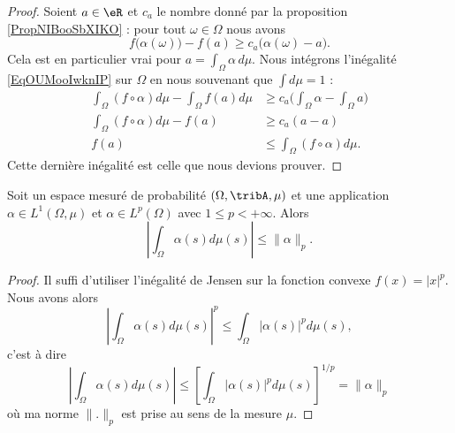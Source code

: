 \begin{proof}
    Soient \( a\in \eR\) et \( c_a\) le nombre donné par la proposition \ref{PropNIBooSbXIKO} : pour tout \( \omega\in \Omega\) nous avons
    \begin{equation}    \label{EqOUMooIwknIP}
        f\big( \alpha(\omega) \big)-f(a)\geq c_a\big( \alpha(\omega)-a \big).
    \end{equation}
    Cela est en particulier vrai pour \( a=\int_{\Omega}\alpha\,d\mu\). Nous intégrons l'inégalité \eqref{EqOUMooIwknIP} sur \( \Omega\) en nous souvenant que \( \int d\mu=1\) :
    \begin{subequations}
        \begin{align}
            \int_{\Omega}(f\circ \alpha)d\mu-\int_{\Omega}f(a)d\mu&\geq c_a\big( \int_{\Omega}\alpha-\int_{\Omega}a \big)\\
            \int_{\Omega}(f\circ \alpha)d\mu-f(a)&\geq c_a(a-a)\\
            f(a)&\leq \int_{\Omega}(f\circ\alpha)d\mu.
        \end{align}
    \end{subequations}
    Cette dernière inégalité est celle que nous devions prouver.
\end{proof}

\begin{corollary}
    Soit un espace mesuré de probabilité \( (\Omega,\tribA,\mu)\) et une application \( \alpha\in L^1(\Omega,\mu)\) et \( \alpha\in L^p(\Omega)\) avec \( 1\leq p<+\infty\). Alors
    \begin{equation}
        | \int_{\Omega}\alpha(s)d\mu(s) |\leq \| \alpha \|_p.
    \end{equation}
\end{corollary}

\begin{proof}
    Il suffi d'utiliser l'inégalité de Jensen sur la fonction convexe \( f(x)=| x |^p\). Nous avons alors
    \begin{equation}
        | \int_{\Omega}\alpha(s)d\mu(s) |^p\leq \int_{\Omega}| \alpha(s) |^pd\mu(s),
    \end{equation}
    c'est à dire
    \begin{equation}
        | \int_{\Omega}\alpha(s)d\mu(s) |\leq  \left[  \int_{\Omega}| \alpha(s) |^pd\mu(s)\right]^{1/p}=\| \alpha \|_p
    \end{equation}
    où ma norme \( \| . \|_p\) est prise au sens de la mesure \( \mu\).
\end{proof}

